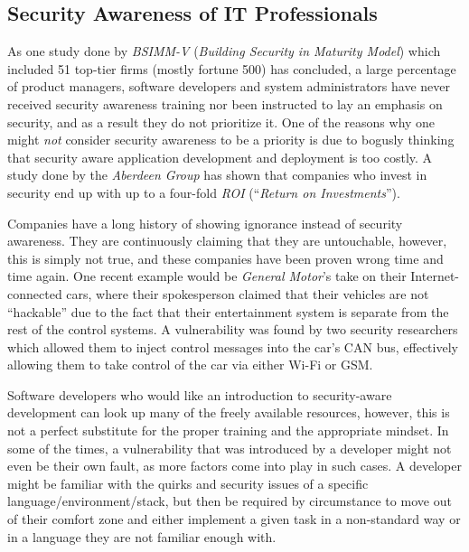 \documentclass[a4paper,12pt]{article}
\begin{document}
\subsection{Security Awareness of IT Professionals}
 
	
	As one study done by \textit{BSIMM-V} (\textit{Building Security in Maturity Model}) which included 51 top-tier firms (mostly fortune 500) has concluded\cite{gmcgraw12}, a large percentage of product managers, software developers and system administrators have never received security awareness training nor been instructed to lay an emphasis on security, and as a result they do not prioritize it. One of the reasons why one might \textit{not} consider security awareness to be a priority is due to bogusly thinking that security aware application development and deployment is too costly. A study done by the \textit{Aberdeen Group} has shown that companies who invest in security end up with up to a four-fold \textit{ROI} (``\textit{Return on Investments}'').\cite{aberdeen11}
	
	Companies have a long history of showing ignorance instead of security awareness. They are continuously claiming that they are untouchable, however, this is simply not true, and these companies have been proven wrong time and time again. One recent example would be \textit{General Motor}'s take on their Internet-connected cars, where their spokesperson claimed that their vehicles are not ``hackable'' due to the fact that their entertainment system is separate from the rest of the control systems. A vulnerability was found by two security researchers\cite{cmiller15} which allowed them to inject control messages into the car's CAN bus, effectively allowing them to take control of the car via either Wi-Fi or GSM.
	
	Software developers who would like an introduction to security-aware development can look up many of the freely available resources, however, this is not a perfect substitute for the proper training and the appropriate mindset. In some of the times, a vulnerability that was introduced by a developer might not even be their own fault, as more factors come into play in such cases. A developer might be familiar with the quirks and security issues of a specific language/environment/stack, but then be required by circumstance to move out of their comfort zone and either implement a given task in a non-standard way or in a language they are not familiar enough with.
	
\end{document}
